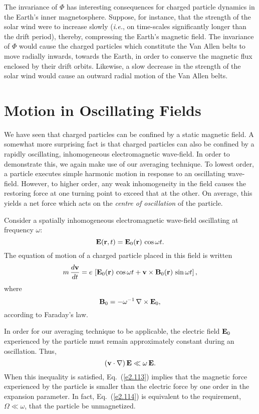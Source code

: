The invariance of ${\Phi}$ has interesting consequences for charged
particle dynamics in the Earth's inner magnetosphere. Suppose, for instance,  
that the
strength of the solar wind were to increase slowly ({\em i.e.}, on time-scales
significantly longer than the drift period), thereby, compressing the Earth's
magnetic field. The invariance of ${\Phi}$ would cause the charged particles
which constitute the Van Allen belts 
 to move radially inwards, towards the Earth, in order
to conserve the magnetic flux enclosed by their drift orbits. Likewise, a
slow decrease in the strength of the solar wind would cause an outward radial motion
of the Van Allen belts.

\section{Motion in Oscillating Fields}
We have seen that charged particles can be confined by a static magnetic field.
A somewhat more surprising fact is that charged
particles can also be confined by a rapidly
oscillating, inhomogeneous electromagnetic wave-field. In order to demonstrate this,
we again make use of our averaging technique. To lowest order, a particle
executes simple harmonic motion in response to an oscillating wave-field.
However, to higher order, any weak inhomogeneity in the field causes the restoring force
at one turning point to exceed that at the other. On average, this yields a net force
which acts on the {\em centre of oscillation}\/ of the particle.

Consider a spatially inhomogeneous electromagnetic wave-field oscillating at
frequency $\omega$:
\begin{equation}
{\bf E}({\bf r}, t) = {\bf E}_0({\bf r})\,\cos\omega t.
\end{equation}
The equation of motion of a charged particle placed in this field is written
\begin{equation}\label{e2.112}
m\,\frac{d{\bf v}}{dt}= e\,\left[{\bf E}_0({\bf r})\,\cos\omega t
+{\bf v}
\times {\bf B}_0({\bf r})\,\sin\omega t\right],
\end{equation}
where 
\begin{equation}\label{e2.113}
{\bf B}_0 = -\omega^{-1}\,\nabla\times{\bf E}_0,
\end{equation}
according to Faraday's law. 

In order for our averaging technique to be applicable, the electric field
${\bf E}_0$ experienced by the particle must remain approximately constant
during an oscillation. Thus,
\begin{equation}\label{e2.114}
({\bf v}\cdot\nabla)\,{\bf E} \ll \omega\,{\bf E}.
\end{equation}
When this inequality is satisfied, Eq.~(\ref{e2.113}) implies that the magnetic
force experienced by the particle
is smaller than the electric force by one order in the
expansion parameter. In fact, Eq.~(\ref{e2.114}) is equivalent to the requirement,
${\Omega}\ll \omega$, that the particle be unmagnetized. 

